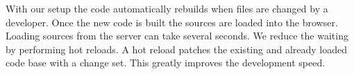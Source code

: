 \documentclass[../ClassicThesis.tex]{subfiles}
\begin{document}
With our setup the code automatically rebuilds when files
are changed by a developer. Once the new code is built the
sources are loaded into the browser. Loading sources from the
server can take several seconds. We reduce the waiting by
performing hot reloads. A hot reload patches the existing
and already loaded code base with a change set. This greatly
improves the development speed.












\end{document}
